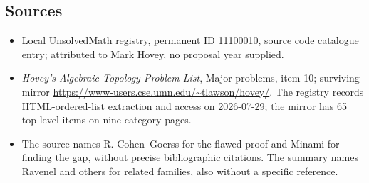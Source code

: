 \documentclass[11pt]{article}
\begin{document}
\subsection{Sources}
\begin{itemize}
\item Local UnsolvedMath registry, permanent ID 11100010, source code catalogue entry; attributed to Mark Hovey, no proposal year supplied.
\item \emph{Hovey's Algebraic Topology Problem List}, Major problems, item 10; surviving mirror \url{https://www-users.cse.umn.edu/~tlawson/hovey/}. The registry records HTML-ordered-list extraction and access on 2026-07-29; the mirror has 65 top-level items on nine category pages.
\item The source names R. Cohen--Goerss for the flawed proof and Minami for finding the gap, without precise bibliographic citations. The summary names Ravenel and others for related families, also without a specific reference.
\end{itemize}
\end{document}
